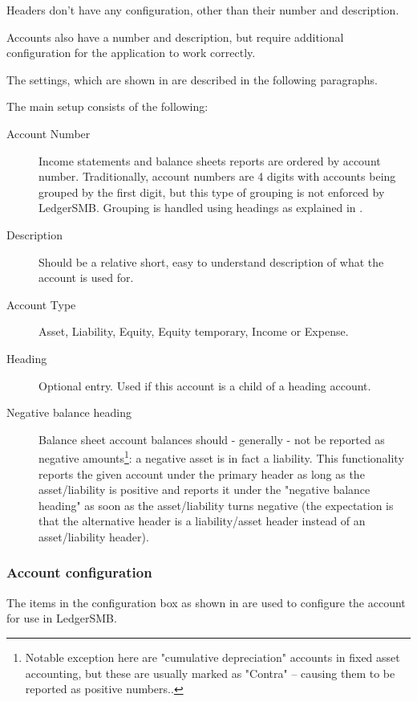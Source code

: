 Headers don't have any configuration, other than their number and description. 

Accounts also
have a number and description, but require additional configuration for the application to work
correctly. 

The settings, which are shown in  are described in the following paragraphs.

The main setup consists of the following:

\begin{description}
    \item[Account Number] Income statements and balance sheets reports are ordered by account number. Traditionally, account numbers are 4 digits with accounts being grouped by the first digit, but this type of grouping is not enforced by LedgerSMB. Grouping is handled using headings as explained in .
    \item[Description] Should be a relative short, easy to understand description of what the account is used for.
    \item[Account Type] Asset, Liability, Equity, Equity temporary, Income or Expense.
    \item[Heading] Optional entry. Used if this account is a child of a heading account.
    \item[Negative balance heading] Balance sheet account balances should - generally - not be reported as negative amounts\footnote{Notable exception here are "cumulative depreciation" accounts in fixed asset accounting, but these are usually marked as "Contra" -- causing them to be reported as positive numbers..}: a negative asset is in fact a liability. This functionality reports the given account under the primary header as long as the asset/liability is positive and reports it under the "negative balance heading" as soon as the asset/liability turns negative (the expectation is that the alternative header is a liability/asset header instead of an asset/liability header).
\end{description}

\subsubsection{Account configuration}
\label{subsec-coa-account-configuration}

The items in the configuration box as shown in  are used to configure the account for use in LedgerSMB.

